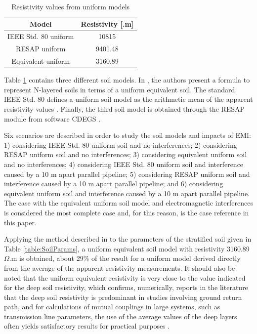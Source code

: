 \documentclass[conference]{IEEEtran}
\begin{document}
	\begin{table}[!hbt]
		\renewcommand{\arraystretch}{1.3}
		\caption{Resistivity values from uniform models}
		\label{table:ResistivityValues}
		\centering
		\begin{tabular}{|c|c|}
			\hline
			\textbf{Model} & \textbf{Resistivity [\boldmath{$\Omega$}.m]} \\
			\hline
			IEEE Std. 80 uniform & 10815\\
			\hline
			RESAP uniform & 9401.48\\
			\hline
			Equivalent uniform & 3160.89\\
			\hline
		\end{tabular}
	\end{table}
	
	Table \ref{table:ResistivityValues} contains three different soil models. In \cite{Martins-Britto2019}, the authors present a formula to represent N-layered soils in terms of a uniform equivalent soil. The standard IEEE Std. 80 defines a uniform soil model as the arithmetic mean of the apparent resistivity values \cite{IEEEStd80}. Finally, the third soil model is obtained through the RESAP module from software CDEGS \cite{Dawalibi1984a}.
	
	Six scenarios are described in order to study the soil models and impacts of EMI:  1) considering IEEE Std. 80 uniform soil and no interferences; 2) considering RESAP uniform soil and no interferences; 3) considering equivalent uniform soil and no interferences; 4) considering IEEE Std. 80 uniform soil and interference caused by a 10 m apart parallel pipeline; 5) considering RESAP uniform soil and interference caused by a 10 m apart parallel pipeline; and 6) considering equivalent uniform soil and interference caused by a 10 m apart parallel pipeline. The case with the equivalent uniform soil model and electromagnetic interferences is considered the most complete case and, for this reason, is the case reference in this paper.
	
	Applying the method described in \cite{Martins-Britto2019} to the parameters of the stratified soil given in Table \ref{table:SoilParams}, a uniform equivalent soil model with resistivity 3160.89 $\Omega$.m is obtained, about 29\% of the result for a uniform model derived directly from the average of the apparent resistivity measurements. It should also be noted that the uniform equivalent resistivity is very close to the value indicated for the deep soil resistivity, which confirms, numerically, reports in the literature that the deep soil resistivity is predominant in studies involving ground return path, and for calculations of mutual couplings in large systems, such as transmission line parameters, the use of the average values of the deep layers often yields satisfactory results for practical purposes \cite{Southey2005}.
	
\end{document}
